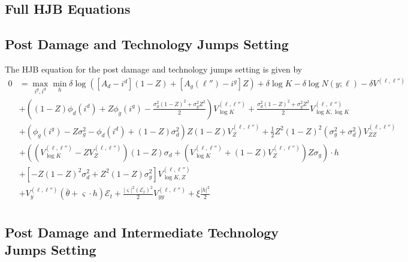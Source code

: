 \documentclass[12pt]{article}
\begin{document}
\begin{appendices}

\section{Full HJB Equations}\label{app:FullHJB}


\subsection{Post Damage and Technology Jumps Setting}

The HJB equation for the post damage and technology jumps setting is given by
\begin{equation*}
\begin{split}
0 & = \max_{i^{g},i^{d}} \min_{h} \delta\log([A_{d}-i^{d}](1-Z)+[A_{g}(\ell'')-i^{g}]Z) + \delta\log K - \delta \log N(y; \ell) - \delta V^{(\ell,\ell'')}\\
 & + \left((1-Z) \phi_d(i^{d}) +Z \phi_g(i^{g}) - \frac{   \sigma_d^2 (1-Z)^2 + \sigma_g^2 Z^2 }{2} \right)V^{(\ell,\ell'')}_{\log K} + \frac{  \sigma_d^2 (1-Z)^2 + \sigma_g^2 Z^2}{2} V^{(\ell,\ell'')}_{\log K,  \log K}  \\
 & +\left( \phi_g(i^{g}) - Z \sigma_g^2 - \phi_d(i^{d}) + (1-Z) \sigma_d^2  \right) Z (1-Z) V^{(\ell,\ell'')}_{Z} + \frac{1}{2} Z^2 (1-Z)^2 ({ \sigma_g^2 + \sigma_d^2} ) V^{(\ell,\ell'')}_{ZZ} \\
 & + \left( \left( V^{(\ell,\ell'')}_{\log K} -  Z V^{(\ell,\ell'')}_{Z} \right) (1-Z) \sigma_d  + \left( V^{(\ell,\ell'')}_{\log K} + (1-Z) V^{(\ell,\ell'')}_{Z} \right)  Z \sigma_g \right) \cdot h \\
  & + \left[-Z(1-Z)^2\sigma_d^2 + Z^2(1-Z)\sigma_g^2\right]V^{(\ell,\ell'')}_{\log K, Z} \\
 & + V^{(\ell,\ell'')}_{y}(\bar{\theta} + \varsigma \cdot h) \mathcal{E}_t   +\frac{|\varsigma|^{2}( \mathcal{E}_t)^{2}}{2} V^{(\ell,\ell'')}_{yy} + \xi \frac{|h|^2}{2} \\
\end{split}
\end{equation*}


\subsection{Post Damage and Intermediate Technology Jumps Setting}


\end{appendices}
\end{document}
